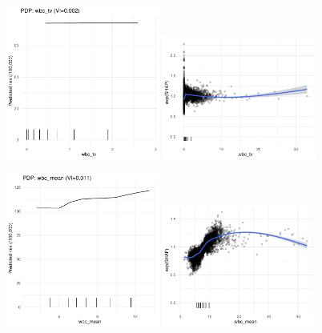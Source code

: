 \documentclass[12pt]{article}
\begin{document}
\begin{figure}[h]
\centering
\includegraphics[width=0.45\textwidth]{figures/pdp_new/wbc_tv.pdf}
\includegraphics[width=0.45\textwidth]{figures/shap_new/wbc_tv.pdf}
\end{figure}
\begin{figure}[h]
\centering
\includegraphics[width=0.45\textwidth]{figures/pdp_new/wbc_mean.pdf}
\includegraphics[width=0.45\textwidth]{figures/shap_new/wbc_mean.pdf}
\end{figure}
\end{document}
